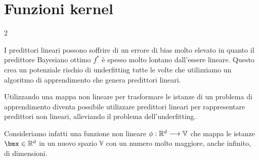 \documentclass[\main/main.tex]{subfiles}
\begin{document}
\chapter{Funzioni kernel}
\begin{multicols}{2}
\begin{observation}
    I predittori lineari possono soffrire di un errore di bias molto elevato in quanto il predittore Bayesiano ottimo \(f^*\) è spesso molto lontano dall'essere lineare. Questo crea un potenziale rischio di underfitting tutte le volte che utilizziamo un algoritmo di apprendimento che genera predittori lineari.
\end{observation}
\begin{observation}
    Utilizzando una mappa non lineare per trasformare le istanze di un problema di apprendimento diventa possibile utilizzare predittori lineari per rappresentare predittori non lineari, alleviando il problema dell'underfitting.
    
    Consideriamo infatti una funzione non lineare \(\phi:\mathbb{R}^d\longrightarrow \mathbb{V}\) che mappa le istanze \(\bmx \in \R^d\) in un nuovo spazio \(\mathbb{V}\) con un numero molto maggiore, anche infinito, di dimensioni.
    

\end{observation}
\end{multicols}
\end{document}

